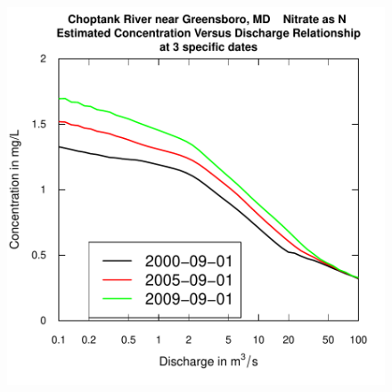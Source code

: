 \documentclass[a4paper,11pt]{article}
\begin{document}
\begin{figure}[htbp]
  \begin{minipage}[h]{0.5\linewidth}
    \begin{center}

\includegraphics{EGRET-figplotConcQSmooth}
    \label{fig:plotConcQSmooth}
    \end{center}
  \end{minipage}
  \hspace{0.5cm}
  \begin{minipage}[h]{0.5\linewidth}
    \begin{center}



\end{center}
\end{minipage}
\end{figure}
\end{document}
